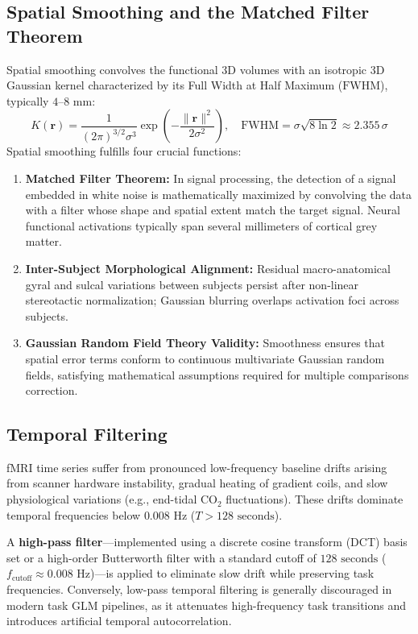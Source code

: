 \documentclass[11pt,a4paper]{article}
\begin{document}
\subsection{Spatial Smoothing and the Matched Filter Theorem}
Spatial smoothing convolves the functional 3D volumes with an isotropic 3D Gaussian kernel characterized by its Full Width at Half Maximum ($\text{FWHM}$), typically $4\text{--}8\text{ mm}$:
\begin{equation}
    K(\mathbf{r}) = \frac{1}{(2\pi)^{3/2} \sigma^3} \exp\left( -\frac{\|\mathbf{r}\|^2}{2\sigma^2} \right), \quad \text{FWHM} = \sigma \sqrt{8 \ln 2} \approx 2.355 \, \sigma
\end{equation}
Spatial smoothing fulfills four crucial functions:
\begin{enumerate}
    \item \textbf{Matched Filter Theorem:} In signal processing, the detection of a signal embedded in white noise is mathematically maximized by convolving the data with a filter whose shape and spatial extent match the target signal. Neural functional activations typically span several millimeters of cortical grey matter.
    \item \textbf{Inter-Subject Morphological Alignment:} Residual macro-anatomical gyral and sulcal variations between subjects persist after non-linear stereotactic normalization; Gaussian blurring overlaps activation foci across subjects.
    \item \textbf{Gaussian Random Field Theory Validity:} Smoothness ensures that spatial error terms conform to continuous multivariate Gaussian random fields, satisfying mathematical assumptions required for multiple comparisons correction.
\end{enumerate}

\subsection{Temporal Filtering}
fMRI time series suffer from pronounced low-frequency baseline drifts arising from scanner hardware instability, gradual heating of gradient coils, and slow physiological variations (e.g., end-tidal $\text{CO}_2$ fluctuations). These drifts dominate temporal frequencies below $0.008\text{ Hz}$ ($T > 128\text{ seconds}$). 

A \textbf{high-pass filter}—implemented using a discrete cosine transform (DCT) basis set or a high-order Butterworth filter with a standard cutoff of $128\text{ seconds}$ ($f_{\text{cutoff}} \approx 0.008\text{ Hz}$)—is applied to eliminate slow drift while preserving task frequencies. Conversely, low-pass temporal filtering is generally discouraged in modern task GLM pipelines, as it attenuates high-frequency task transitions and introduces artificial temporal autocorrelation.
\end{document}
